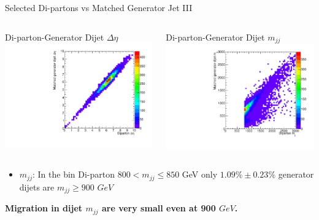 \documentclass[8pt]{beamer}
\begin{document}
\begin{frame}{Selected Di-partons vs Matched Generator Jet III}

\begin{columns}

  \centering

  \begin{block}{Di-parton-Generator Dijet $\Delta\eta$}
    \centering
    \includegraphics[width=0.8\linewidth]{img/SelDiParton_MatchedGenJet_DEta.pdf}
  \end{block}
  
  \centering
 
  \begin{block}{Di-parton-Generator Dijet $m_{jj}$}
    \centering
    \includegraphics[width=0.8\linewidth]{img/SelDiParton_MatchedGenJet_Mjj.pdf}
  \end{block}

\end{columns}

\begin{itemize}
  \item \tiny{$m_{jj}$: In the bin Di-parton $800<m_{jj}\leq850$ GeV only $1.09\% \pm 0.23\%$ generator dijets are $m_{jj}\geq900$ $GeV$}
\end{itemize}

\begin{center}
\textbf{Migration in dijet $m_{jj}$ are very small even at 900 $GeV$.}
\end{center}

\end{frame}
\end{document}
